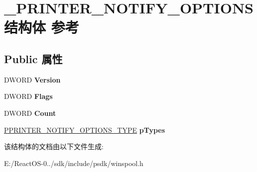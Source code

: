 \hypertarget{struct___p_r_i_n_t_e_r___n_o_t_i_f_y___o_p_t_i_o_n_s}{}\section{\+\_\+\+P\+R\+I\+N\+T\+E\+R\+\_\+\+N\+O\+T\+I\+F\+Y\+\_\+\+O\+P\+T\+I\+O\+N\+S结构体 参考}
\label{struct___p_r_i_n_t_e_r___n_o_t_i_f_y___o_p_t_i_o_n_s}
\subsection*{Public 属性}
\begin{DoxyCompactItemize}
\item 
\mbox{\label{struct___p_r_i_n_t_e_r___n_o_t_i_f_y___o_p_t_i_o_n_s_afafa7cdb4a6ab12840f752634bc3872b}} 
D\+W\+O\+RD {\bfseries Version}
\item 
\mbox{\label{struct___p_r_i_n_t_e_r___n_o_t_i_f_y___o_p_t_i_o_n_s_a4ba86d46a22dc85c97f45da001fe73be}} 
D\+W\+O\+RD {\bfseries Flags}
\item 
\mbox{\label{struct___p_r_i_n_t_e_r___n_o_t_i_f_y___o_p_t_i_o_n_s_abbb9cd5e6961f31966398c0380cd6f6c}} 
D\+W\+O\+RD {\bfseries Count}
\item 
\mbox{\label{struct___p_r_i_n_t_e_r___n_o_t_i_f_y___o_p_t_i_o_n_s_a85ce4d05f0f7f1e26d145a86eccd1b9b}} 
\hyperlink{struct___p_r_i_n_t_e_r___n_o_t_i_f_y___o_p_t_i_o_n_s___t_y_p_e}{P\+P\+R\+I\+N\+T\+E\+R\+\_\+\+N\+O\+T\+I\+F\+Y\+\_\+\+O\+P\+T\+I\+O\+N\+S\+\_\+\+T\+Y\+PE} {\bfseries p\+Types}
\end{DoxyCompactItemize}


该结构体的文档由以下文件生成\+:\begin{DoxyCompactItemize}
\item 
E\+:/\+React\+O\+S-\/0../sdk/include/psdk/winspool.\+h\end{DoxyCompactItemize}
